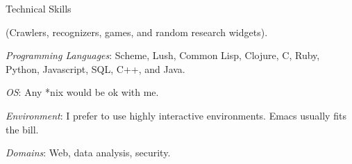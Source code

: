 \begin{rubric}{Technical Skills}{

  (Crawlers, recognizers, games, and random research widgets).

  
  \entry* \emph{Programming Languages}: Scheme, Lush, Common Lisp,
  Clojure, C, Ruby, Python, Javascript, SQL, C++, and Java.
  
  \entry* \emph{OS}: Any *nix would be ok with me.

  \entry* \emph{Environment}: I prefer to use highly interactive
  environments. Emacs usually fits the bill.

  \entry* \emph{Domains}: Web, data analysis, security.
  
}\end{rubric}
